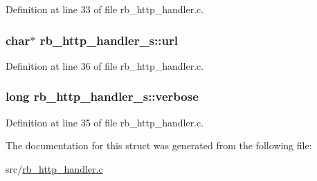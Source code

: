 Definition at line 33 of file rb\-\_\-http\-\_\-handler.\-c.

\hypertarget{structrb__http__handler__s_a1f0df317f6eca7893bb08a54f13870ef}{
\subsubsection[{url}]{\setlength{\rightskip}{0pt plus 5cm}char$\ast$ rb\-\_\-http\-\_\-handler\-\_\-s\-::url}}\label{structrb__http__handler__s_a1f0df317f6eca7893bb08a54f13870ef}


Definition at line 36 of file rb\-\_\-http\-\_\-handler.\-c.

\hypertarget{structrb__http__handler__s_a0bca537c3590135753bdd217559bb422}{
\subsubsection[{verbose}]{\setlength{\rightskip}{0pt plus 5cm}long rb\-\_\-http\-\_\-handler\-\_\-s\-::verbose}}\label{structrb__http__handler__s_a0bca537c3590135753bdd217559bb422}


Definition at line 35 of file rb\-\_\-http\-\_\-handler.\-c.



The documentation for this struct was generated from the following file\-:\begin{DoxyCompactItemize}
\item 
src/\hyperlink{rb__http__handler_8c}{rb\-\_\-http\-\_\-handler.\-c}\end{DoxyCompactItemize}
